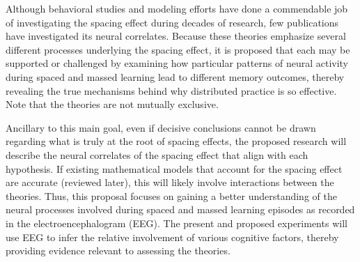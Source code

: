 
Although behavioral studies and modeling efforts have done a commendable job of investigating the spacing effect during decades of research, few publications have investigated its neural correlates.  Because these theories emphasize several different processes underlying the spacing effect, it is proposed that each may be supported or challenged by examining how particular patterns of neural activity during spaced and massed learning lead to different memory outcomes, thereby revealing the true mechanisms behind why distributed practice is so effective.  Note that the theories are not mutually exclusive.

Ancillary to this main goal, even if decisive conclusions cannot be drawn regarding what is truly at the root of spacing effects, the proposed research will describe the neural correlates of the spacing effect that align with each hypothesis.  If existing mathematical models that account for the spacing effect are accurate (reviewed later), this will likely involve interactions between the theories.  Thus, this proposal focuses on gaining a better understanding of the neural processes involved during spaced and massed learning episodes as recorded in the electroencephalogram (EEG).  The present and proposed experiments will use EEG to infer the relative involvement of various cognitive factors, thereby providing evidence relevant to assessing the theories.






